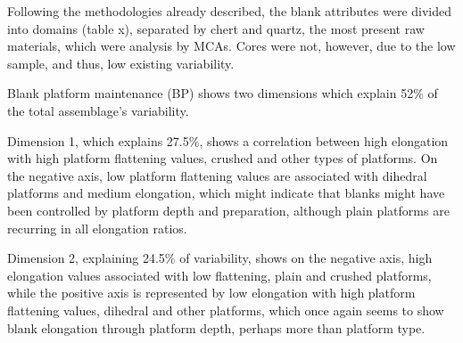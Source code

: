 \documentclass[12pt,twoside]{reedthesis}
\begin{document}
Following the methodologies already described, the blank attributes were divided into domains (table x), separated by chert and quartz, the most present raw materials, which were analysis by MCAs. Cores were not, however, due to the low sample, and thus, low existing variability.

Blank platform maintenance (BP) shows two dimensions which explain 52\% of the total assemblage's variability.

Dimension 1, which explains 27.5\%, shows a correlation between high elongation with high platform flattening values, crushed and other types of platforms. On the negative axis, low platform flattening values are associated with dihedral platforms and medium elongation, which might indicate that blanks might have been controlled by platform depth and preparation, although plain platforms are recurring in all elongation ratios.

Dimension 2, explaining 24.5\% of variability, shows on the negative axis, high elongation values associated with low flattening, plain and crushed platforms, while the positive axis is represented by low elongation with high platform flattening values, dihedral and other platforms, which once again seems to show blank elongation through platform depth, perhaps more than platform type.
\end{document}
